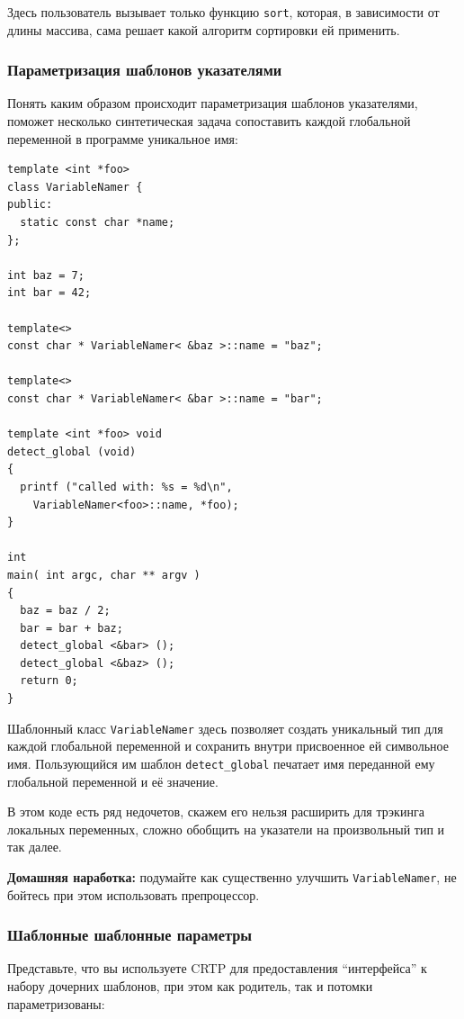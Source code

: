 \documentclass[a4paper,12pt,oneside]{article}
\begin{document}
Здесь пользователь вызывает только функцию \lstinline!sort!, которая, в зависимости от длины массива, сама решает какой алгоритм сортировки ей применить.

\subsubsection{Параметризация шаблонов указателями}\label{PointerTemplateArguments}

Понять каким образом происходит параметризация шаблонов указателями, поможет несколько синтетическая задача сопоставить каждой глобальной переменной в программе уникальное имя:

\begin{lstlisting}
template <int *foo>
class VariableNamer {
public:
  static const char *name;
};

int baz = 7;
int bar = 42;

template<>
const char * VariableNamer< &baz >::name = "baz";

template<>
const char * VariableNamer< &bar >::name = "bar";

template <int *foo> void
detect_global (void)
{
  printf ("called with: %s = %d\n", 
    VariableNamer<foo>::name, *foo);
}

int
main( int argc, char ** argv )
{
  baz = baz / 2;
  bar = bar + baz;
  detect_global <&bar> ();
  detect_global <&baz> ();
  return 0;
}
\end{lstlisting}

Шаблонный класс \lstinline!VariableNamer! здесь позволяет создать уникальный тип для каждой глобальной переменной и сохранить внутри присвоенное ей символьное имя. Пользующийся им шаблон \lstinline!detect_global! печатает имя переданной ему глобальной переменной и её значение.

В этом коде есть ряд недочетов, скажем его нельзя расширить для трэкинга локальных переменных, сложно обобщить на указатели на произвольный тип и так далее.

\textbf{Домашняя наработка:} подумайте как существенно улучшить \lstinline!VariableNamer!, не бойтесь при этом использовать препроцессор.

\subsubsection{Шаблонные шаблонные параметры}\label{TemplateTemplateArguments}

Представьте, что вы используете CRTP для предоставления ``интерфейса'' к набору дочерних шаблонов, при этом как родитель, так и потомки параметризованы:
\end{document}
